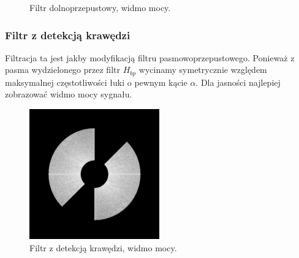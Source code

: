 \documentclass{classrep}
\begin{document}
 \begin{figure}[H]
  \centering
  \caption{Filtr dolnoprzepustowy, widmo mocy.}
  \label{fig_widmo_lena_bs}
\end{figure}

\subsubsection{Filtr z detekcją krawędzi}

Filtracja ta jest jakby modyfikacją filtru pasmowoprzepustowego. Ponieważ z pasma wydzielonego przez filtr $H_{bp}$ wycinamy symetrycznie względem maksymalnej częstotliwości łuki o pewnym kącie $\alpha$. Dla jasności najlepiej zobrazować widmo mocy sygnału.

\begin{figure}[H]
  \centering
  \includegraphics[width=0.5\textwidth]{img/lena_edge_detect}
  \caption{Filtr z detekcją krawędzi, widmo mocy.}
  \label{fig_widmo_lena_edge_detect}
\end{figure}
\end{document}
